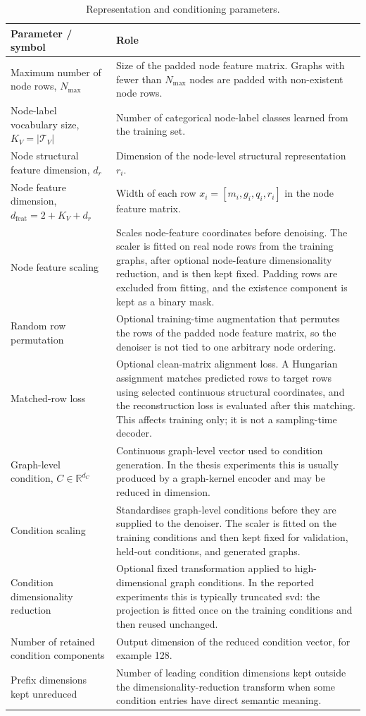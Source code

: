 \begin{table}[p]
\centering
\footnotesize
\begin{tabularx}{\textwidth}{@{}p{}X@{}}
\toprule
Parameter / symbol & Role \\
\midrule
Maximum number of node rows, \(N_{\max}\) & Size of the padded node feature matrix. Graphs with fewer than \(N_{\max}\) nodes are padded with non-existent node rows. \\
Node-label vocabulary size, \(K_V=|\mathcal{T}_V|\) & Number of categorical node-label classes learned from the training set. \\
Node structural feature dimension, \(d_r\) & Dimension of the node-level structural representation \(r_i\). \\
Node feature dimension, \(d_{\mathrm{feat}}=2+K_V+d_r\) & Width of each row \(x_i=[m_i,g_i,q_i,r_i]\) in the node feature matrix. \\
Node feature scaling & Scales node-feature coordinates before denoising. The scaler is fitted on real node rows from the training graphs, after optional node-feature dimensionality reduction, and is then kept fixed. Padding rows are excluded from fitting, and the existence component is kept as a binary mask. \\
Random row permutation & Optional training-time augmentation that permutes the rows of the padded node feature matrix, so the denoiser is not tied to one arbitrary node ordering. \\
Matched-row loss & Optional clean-matrix alignment loss. A Hungarian assignment matches predicted rows to target rows using selected continuous structural coordinates, and the reconstruction loss is evaluated after this matching. This affects training only; it is not a sampling-time decoder. \\
Graph-level condition, \(C\in\mathbb{R}^{d_C}\) & Continuous graph-level vector used to condition generation. In the thesis experiments this is usually produced by a graph-kernel encoder and may be reduced in dimension. \\
Condition scaling & Standardises graph-level conditions before they are supplied to the denoiser. The scaler is fitted on the training conditions and then kept fixed for validation, held-out conditions, and generated graphs. \\
Condition dimensionality reduction & Optional fixed transformation applied to high-dimensional graph conditions. In the reported experiments this is typically truncated \gls{svd}: the projection is fitted once on the training conditions and then reused unchanged. \\
Number of retained condition components & Output dimension of the reduced condition vector, for example 128. \\
Prefix dimensions kept unreduced & Number of leading condition dimensions kept outside the dimensionality-reduction transform when some condition entries have direct semantic meaning. \\
\bottomrule
\end{tabularx}
\caption{Representation and conditioning parameters.}
\label{tab:generator-representation-parameters}
\end{table}

